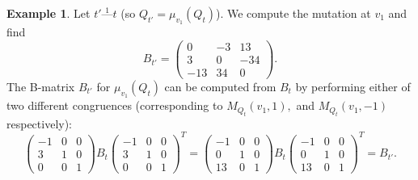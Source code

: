 \documentclass[11pt, letterpaper]{amsart}
\theoremstyle{definition}
\newtheorem{example}[theorem]{Example}
\numberwithin{equation}{section}
\begin{document}
\begin{example}
Let $t' \stackrel{1}{\text{---}}t$ (so $Q_{t'} = \mu_{v_1}(Q_t)$). 
We compute the mutation at $v_1$ and find
$$B_{t'} = 
\begin{pmatrix}
0 & -3 & 13 \\
3 & 0 & -34 \\
-13 & 34 & 0 
\end{pmatrix}.$$
The B-matrix $B_{t'}$ for $\mu_{v_1}(Q_t)$ can be computed from $B_t$ by performing either of two different congruences (corresponding to $M_{Q_t}(v_1, 1),$ and $M_{Q_t}(v_1, -1)$ respectively):
$$ 
\begin{pmatrix} 
-1 & 0 & 0 \\
3 & 1 & 0 \\
0 & 0 & 1
\end{pmatrix} B_t \begin{pmatrix}
-1 & 0 & 0 \\
3 & 1 & 0 \\
0 & 0 & 1
 \end{pmatrix}^T 
= \begin{pmatrix} 
-1 & 0 & 0 \\
0 & 1 & 0 \\
13 & 0 & 1
\end{pmatrix} B_t \begin{pmatrix} 
-1 & 0 & 0 \\
0 & 1 & 0 \\
13 & 0 & 1
\end{pmatrix}^T=B_{t'}.$$


\end{example}
\end{document}
